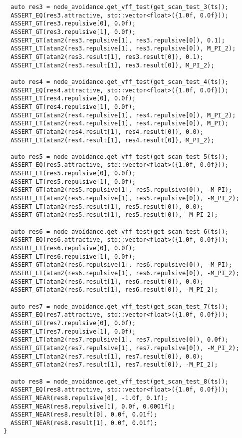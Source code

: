 \begin{tcolorbox}[sharp corners, colframe=gray!80, colback=LightGray, left=0pt, top=0pt, bottom=0pt, title=\texttt{br2\_vff\_avoidance/tests/vff\_test.cpp}]
\begin{verbatim}
  auto res3 = node_avoidance.get_vff_test(get_scan_test_3(ts));
  ASSERT_EQ(res3.attractive, std::vector<float>({1.0f, 0.0f}));
  ASSERT_GT(res3.repulsive[0], 0.0f);
  ASSERT_GT(res3.repulsive[1], 0.0f);
  ASSERT_GT(atan2(res3.repulsive[1], res3.repulsive[0]), 0.1);
  ASSERT_LT(atan2(res3.repulsive[1], res3.repulsive[0]), M_PI_2);
  ASSERT_GT(atan2(res3.result[1], res3.result[0]), 0.1);
  ASSERT_LT(atan2(res3.result[1], res3.result[0]), M_PI_2);

  auto res4 = node_avoidance.get_vff_test(get_scan_test_4(ts));
  ASSERT_EQ(res4.attractive, std::vector<float>({1.0f, 0.0f}));
  ASSERT_LT(res4.repulsive[0], 0.0f);
  ASSERT_GT(res4.repulsive[1], 0.0f);
  ASSERT_GT(atan2(res4.repulsive[1], res4.repulsive[0]), M_PI_2);
  ASSERT_LT(atan2(res4.repulsive[1], res4.repulsive[0]), M_PI);
  ASSERT_GT(atan2(res4.result[1], res4.result[0]), 0.0);
  ASSERT_LT(atan2(res4.result[1], res4.result[0]), M_PI_2);

  auto res5 = node_avoidance.get_vff_test(get_scan_test_5(ts));
  ASSERT_EQ(res5.attractive, std::vector<float>({1.0f, 0.0f}));
  ASSERT_LT(res5.repulsive[0], 0.0f);
  ASSERT_LT(res5.repulsive[1], 0.0f);
  ASSERT_GT(atan2(res5.repulsive[1], res5.repulsive[0]), -M_PI);
  ASSERT_LT(atan2(res5.repulsive[1], res5.repulsive[0]), -M_PI_2);
  ASSERT_LT(atan2(res5.result[1], res5.result[0]), 0.0);
  ASSERT_GT(atan2(res5.result[1], res5.result[0]), -M_PI_2);

  auto res6 = node_avoidance.get_vff_test(get_scan_test_6(ts));
  ASSERT_EQ(res6.attractive, std::vector<float>({1.0f, 0.0f}));
  ASSERT_LT(res6.repulsive[0], 0.0f);
  ASSERT_LT(res6.repulsive[1], 0.0f);
  ASSERT_GT(atan2(res6.repulsive[1], res6.repulsive[0]), -M_PI);
  ASSERT_LT(atan2(res6.repulsive[1], res6.repulsive[0]), -M_PI_2);
  ASSERT_LT(atan2(res6.result[1], res6.result[0]), 0.0);
  ASSERT_GT(atan2(res6.result[1], res6.result[0]), -M_PI_2);

  auto res7 = node_avoidance.get_vff_test(get_scan_test_7(ts));
  ASSERT_EQ(res7.attractive, std::vector<float>({1.0f, 0.0f}));
  ASSERT_GT(res7.repulsive[0], 0.0f);
  ASSERT_LT(res7.repulsive[1], 0.0f);
  ASSERT_LT(atan2(res7.repulsive[1], res7.repulsive[0]), 0.0f);
  ASSERT_GT(atan2(res7.repulsive[1], res7.repulsive[0]), -M_PI_2);
  ASSERT_LT(atan2(res7.result[1], res7.result[0]), 0.0);
  ASSERT_GT(atan2(res7.result[1], res7.result[0]), -M_PI_2);

  auto res8 = node_avoidance.get_vff_test(get_scan_test_8(ts));
  ASSERT_EQ(res8.attractive, std::vector<float>({1.0f, 0.0f}));
  ASSERT_NEAR(res8.repulsive[0], -1.0f, 0.1f);
  ASSERT_NEAR(res8.repulsive[1], 0.0f, 0.0001f);
  ASSERT_NEAR(res8.result[0], 0.0f, 0.01f);
  ASSERT_NEAR(res8.result[1], 0.0f, 0.01f);
}


\end{verbatim}
\end{tcolorbox}

